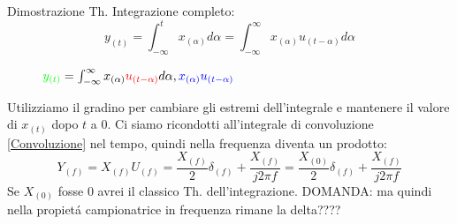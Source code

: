                     
                    Dimostrazione Th. Integrazione completo:\\
                        \[
                            y_{(t)} = \int_{-\infty}^{t} x_{(\alpha)} d\alpha =\int_{-\infty}^{\infty} x_{(\alpha)} u_{(t-\alpha)} d\alpha
                        \]
                        \begin{figure}[H]
                            \centering
                            \caption{${\color{green}y_{(t)}} = \int_{-\infty}^{\infty} {\color{black}x_{(\alpha)}} {\color{red}u_{(t-\alpha)}} d\alpha, {\color{blue}x_{(\alpha)}u_{(t-\alpha)}} $}
                            \label{fig:gradino che limite la funzione}
                        \end{figure}
                        Utilizziamo il gradino per cambiare gli estremi dell'integrale e mantenere il valore di $x_{(t)}$ dopo $t$ a $0$. Ci siamo ricondotti all'integrale di convoluzione \ref{Convoluzione} nel tempo,
                        quindi nella frequenza diventa un prodotto:
                        \[
                            Y_{(f)} =X_{(f)} U_{(f)} = \frac{X_{(f)}}{2}\delta_{(f)} +\frac{X_{(f)}}{j2\pi f} =\frac{X_{(0)}}{2}\delta_{(f)} +\frac{X_{(f)}}{j2\pi f}    
                        \]
                        Se $X_{(0)}$ fosse $0$ avrei il classico Th. dell'integrazione.
                        DOMANDA: ma quindi nella propietá campionatrice in frequenza rimane la delta????